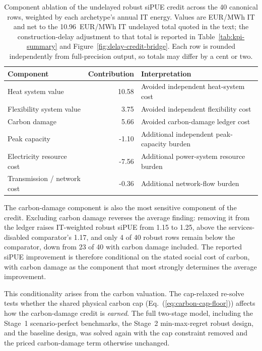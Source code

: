 \documentclass[preprint,12pt]{elsarticle}
\begin{document}
\begin{table}[tbp]
\centering
\small
\caption{Component ablation of the undelayed robust siPUE credit across the 40 canonical rows, weighted by each archetype's annual IT energy. Values are EUR/MWh IT and net to the 10.96~EUR/MWh IT undelayed total quoted in the text; the construction-delay adjustment to that total is reported in Table~\ref{tab:kpi-summary} and Figure~\ref{fig:delay-credit-bridge}. Each row is rounded independently from full-precision output, so totals may differ by a cent or two.}
\label{tab:credit-ablation}
\begin{tabularx}{\linewidth}{L{3.2cm} r Y}
\toprule
Component & Contribution & Interpretation \\
\midrule
Heat system value & 10.58 & Avoided independent heat-system cost \\
Flexibility system value & 3.75 & Avoided independent flexibility cost \\
Carbon damage & 5.66 & Avoided carbon-damage ledger cost \\
Peak capacity & -1.10 & Additional independent peak-capacity burden \\
Electricity resource cost & -7.56 & Additional power-system resource burden \\
Transmission / network cost & -0.36 & Additional network-flow burden \\
\bottomrule
\end{tabularx}
\end{table}

\label{sec:carbon-conditionality}
The carbon-damage component is also the most sensitive component of the credit. Excluding carbon damage reverses the average finding: removing it from the ledger raises IT-weighted robust siPUE from 1.15 to 1.25, above the services-disabled comparator's 1.17, and only 4 of 40 robust rows remain below the comparator, down from 23 of 40 with carbon damage included. The reported siPUE improvement is therefore conditional on the stated social cost of carbon, with carbon damage as the component that most strongly determines the average improvement.

This conditionality arises from the carbon valuation. The cap-relaxed re-solve tests whether the shared physical carbon cap (Eq.~(\ref{eq:carbon-cap-floor})) affects how the carbon-damage credit is \emph{earned}. The full two-stage model, including the Stage~1 scenario-perfect benchmarks, the Stage~2 min-max-regret robust design, and the baseline design, was solved again with the cap constraint removed and the priced carbon-damage term otherwise unchanged.
\end{document}
